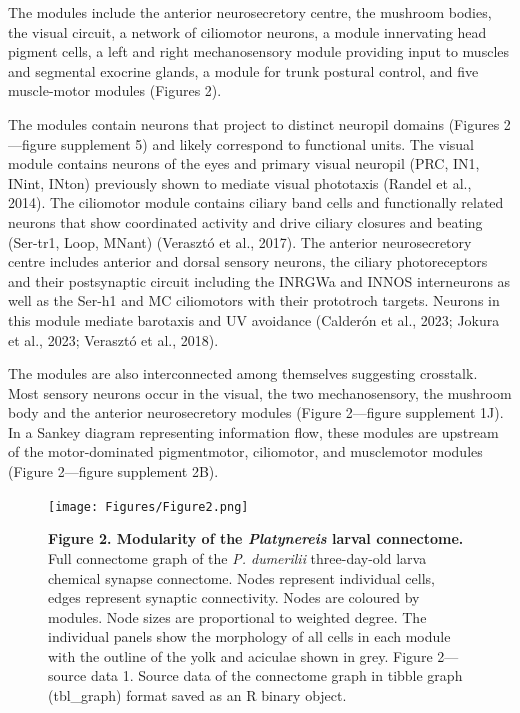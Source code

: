 \documentclass[
  11pt,
]{article}
\begin{document}
The modules include the anterior neurosecretory centre, the mushroom
bodies, the visual circuit, a network of ciliomotor neurons, a module
innervating head pigment cells, a left and right mechanosensory module
providing input to muscles and segmental exocrine glands, a module for
trunk postural control, and five muscle-motor modules (Figures 2).

The modules contain neurons that project to distinct neuropil domains
(Figures 2---figure supplement 5) and likely correspond to functional
units. The visual module contains neurons of the eyes and primary visual
neuropil (PRC, IN1, INint, INton) previously shown to mediate visual
phototaxis (Randel et al., 2014). The ciliomotor module contains ciliary
band cells and functionally related neurons that show coordinated
activity and drive ciliary closures and beating (Ser-tr1, Loop, MNant)
(Verasztó et al., 2017). The anterior neurosecretory centre includes
anterior and dorsal sensory neurons, the ciliary photoreceptors and
their postsynaptic circuit including the INRGWa and INNOS interneurons
as well as the Ser-h1 and MC ciliomotors with their prototroch targets.
Neurons in this module mediate barotaxis and UV avoidance (Calderón et
al., 2023; Jokura et al., 2023; Verasztó et al., 2018).

The modules are also interconnected among themselves suggesting
crosstalk. Most sensory neurons occur in the visual, the two
mechanosensory, the mushroom body and the anterior neurosecretory
modules (Figure 2---figure supplement 1J). In a Sankey diagram
representing information flow, these modules are upstream of the
motor-dominated pigmentmotor, ciliomotor, and musclemotor modules
(Figure 2---figure supplement 2B).

\begin{figure}[H]

{\centering \texttt{[image: Figures/Figure2.png]}

}

\caption{\textbf{Figure 2. Modularity of the \emph{Platynereis} larval
connectome.} Full connectome graph of the \emph{P. dumerilii}
three-day-old larva chemical synapse connectome. Nodes represent
individual cells, edges represent synaptic connectivity. Nodes are
coloured by modules. Node sizes are proportional to weighted degree. The
individual panels show the morphology of all cells in each module with
the outline of the yolk and aciculae shown in grey. Figure 2---source
data 1. Source data of the connectome graph in tibble graph (tbl\_graph)
format saved as an R binary object.}

\end{figure}%
\end{document}
